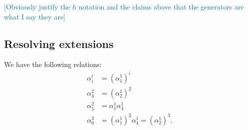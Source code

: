 \documentclass{MetricNotes2023}
\def\textcolour{\textcolor}
\begin{document}
\textcolour{teal}{[Obviously justify the \(h\) notation and the claims above that the generators are what I say they are]}

\subsection{Resolving extensions}


\begin{proposition}
We have the following relations:
\begin{align*}
\alpha^i_i &= (\alpha_1^1)^i\\
\alpha_4^2&=(\alpha^1_2)^2\\
\alpha^2_5&=\alpha^1_1 \alpha^1_4\\
\alpha^3_6&=(\alpha^1_1)^2 \alpha_4^1=(\alpha^1_2)^3.
\end{align*}
\end{proposition}
\end{document}
